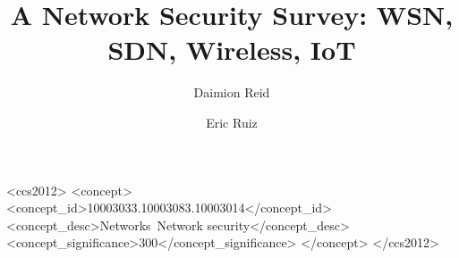 \documentclass[sigconf]{acmart}
\begin{document}
\title{A Network Security Survey: WSN, SDN, Wireless, IoT}

\author{Daimion Reid}

\author{Eric Ruiz}

\begin{CCSXML}
<ccs2012>
<concept>
<concept_id>10003033.10003083.10003014</concept_id>
<concept_desc>Networks~Network security</concept_desc>
<concept_significance>300</concept_significance>
</concept>
</ccs2012>
\end{CCSXML}





\maketitle





\end{document}
